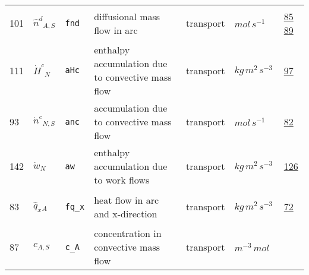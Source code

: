 \begin{longtable}{|p{1cm}|p{2.5cm}|p{4.5cm}|p{8cm}|p{3.0cm}|p{3cm}|p{1cm}|}
                 \\
            101
             & \hypertarget{"v:101"}{ $ {{\hat{n}^d}}{_{A, S}} $}
             & \verb|fnd|
             & diffusional mass flow in arc
             & \begin{lay}transport \end{lay}
             & $ mol \,s^{-1} \, $
             &                 \hyperlink{"e:85"}{ 85 }
                                 \hyperlink{"e:89"}{ 89 }
                 \\
            111
             & \hypertarget{"v:111"}{ $ {{\dot{H}^c}}{_{N}} $}
             & \verb|aHc|
             & enthalpy accumulation due to convective mass flow
             & \begin{lay}transport \end{lay}
             & $ kg \,m^{2} \,s^{-3} \, $
             &                 \hyperlink{"e:97"}{ 97 }
                 \\
            93
             & \hypertarget{"v:93"}{ $ {{\dot{n}^c}}{_{N, S}} $}
             & \verb|anc|
             & accumulation due to convective mass flow
             & \begin{lay}transport \end{lay}
             & $ mol \,s^{-1} \, $
             &                 \hyperlink{"e:82"}{ 82 }
                 \\
            142
             & \hypertarget{"v:142"}{ $ {{\dot{w}}}{_{N}} $}
             & \verb|aw|
             & enthalpy accumulation due to work flows
             & \begin{lay}transport \end{lay}
             & $ kg \,m^{2} \,s^{-3} \, $
             &                 \hyperlink{"e:126"}{ 126 }
                 \\
            83
             & \hypertarget{"v:83"}{ $ {{\hat{q}_x}}{_{A}} $}
             & \verb|fq_x|
             & heat flow in arc and x-direction
             & \begin{lay}transport \end{lay}
             & $ kg \,m^{2} \,s^{-3} \, $
             &                 \hyperlink{"e:72"}{ 72 }
                 \\
            87
             & \hypertarget{"v:87"}{ $ {c}{_{A, S}} $}
             & \verb|c_A|
             & concentration in convective mass flow
             & \begin{lay}transport \end{lay}
             & $ m^{-3} \,mol \, $

\end{longtable}
